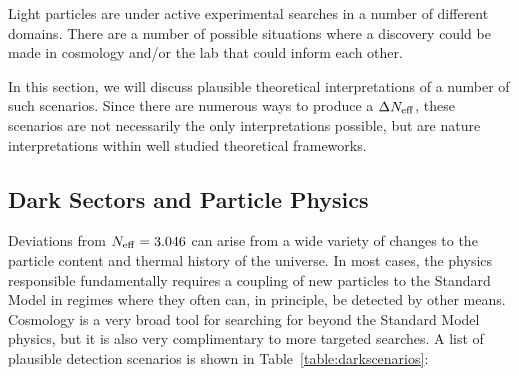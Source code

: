 Light particles are under active experimental searches in a number of different domains.  There are a number of possible situations where a discovery could be made in cosmology and/or the lab that could inform each other.

In this section, we will discuss plausible theoretical interpretations of a number of such scenarios.  Since there are numerous ways to produce a $\Delta N_{\rm eff}$, these scenarios are not necessarily the only interpretations possible, but are nature interpretations within well studied theoretical frameworks.   

\subsection{Dark Sectors and Particle Physics}

Deviations from $N_{\rm eff} = 3.046$ can arise from a wide variety of changes to the particle content and thermal history of the universe.  In most cases, the physics responsible fundamentally requires a coupling of new particles to the Standard Model in regimes where they often can, in principle, be detected by other means.  Cosmology is a very broad tool for searching for beyond the Standard Model physics, but it is also very complimentary to more targeted searches.  A list of plausible detection scenarios is shown in Table~\ref{table:darkscenarios}:
